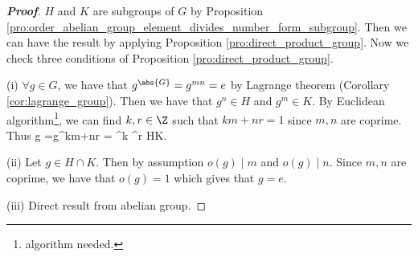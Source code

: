 \begin{proof}[\bf Proof]
$H$ and $K$ are subgroups of $G$ by Proposition \ref{pro:order_abelian_group_element_divides_number_form_subgroup}. Then we can have the result by applying Proposition \ref{pro:direct_product_group}.  Now we check three conditions of Proposition \ref{pro:direct_product_group}. 
\ben
\item [(i)] $\forall g\in G$, we have that $g^{\abs{G}} = g^{mn} = e$ by Lagrange theorem (Corollary \ref{cor:lagrange_group}). Then we have that $g^n \in H$ and $g^m \in K$. By Euclidean algorithm\footnote{algorithm needed.}, we can find $k,r \in \Z$ such that $km + nr = 1$ since $m,n$ are coprime. Thus 
\be
g =g^{km+nr} = ^k ^r \in HK.
\ee


\item [(ii)] Let $g\in H\cap K$. Then by assumption $o(g)\mid m$ and $o(g) \mid n$. Since $m,n$ are coprime, we have that $o(g) = 1$ which gives that $g=e$. 

\item [(iii)] Direct result from abelian group.
\een
\end{proof}









